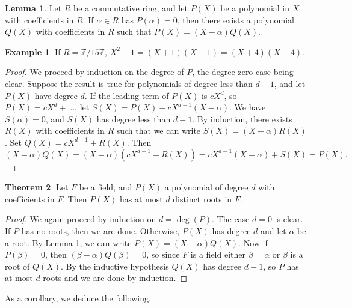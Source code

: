 \documentclass{article}
\newcommand{\Z}{\mathbb{Z}}
\newcommand{\rb}[1]{\left( #1 \right)}
\theoremstyle{definition}\newtheorem{definition}{Definition}
\theoremstyle{definition}\newtheorem*{remark}{Remark}
\theoremstyle{definition}\newtheorem*{example}{Example}
\theoremstyle{definition}\newtheorem*{note}{Note}
\newtheorem{lemma}[definition]{Lemma}
\newtheorem{theorem}[definition]{Theorem}
\begin{document}
\begin{lemma}
\label{lem:21}
Let $ R $ be a commutative ring, and let $ P\rb{X} $ be a polynomial in $ X $ with coefficients in $ R $. If $ \alpha \in R $ has $ P\rb{\alpha} = 0 $, then there exists a polynomial $ Q\rb{X} $ with coefficients in $ R $ such that $ P\rb{X} = \rb{X - \alpha}Q\rb{X} $.
\end{lemma}

\begin{example}
If $ R = \Z / 15\Z $, $ X^2 - 1 = \rb{X + 1}\rb{X - 1} = \rb{X + 4}\rb{X - 4} $.
\end{example}

\begin{proof}
We proceed by induction on the degree of $ P $, the degree zero case being clear. Suppose the result is true for polynomials of degree less than $ d - 1 $, and let $ P\rb{X} $ have degree $ d $. If the leading term of $ P\rb{X} $ is $ cX^d $, so $ P\rb{X} = cX^d + \dots $, let $ S\rb{X} = P\rb{X} - cX^{d - 1}\rb{X - \alpha} $. We have $ S\rb{\alpha} = 0 $, and $ S\rb{X} $ has degree less than $ d - 1 $. By induction, there exists $ R\rb{X} $ with coefficients in $ R $ such that we can write $ S\rb{X} = \rb{X - \alpha}R\rb{X} $. Set $ Q\rb{X} = cX^{d - 1} + R\rb{X} $. Then
$$ \rb{X - \alpha}Q\rb{X} = \rb{X - \alpha}\rb{cX^{d - 1} + R\rb{X}} = cX^{d - 1}\rb{X - \alpha} + S\rb{X} = P\rb{X}. $$
\end{proof}

\begin{theorem}
\label{thm:22}
Let $ F $ be a field, and $ P\rb{X} $ a polynomial of degree $ d $ with coefficients in $ F $. Then $ P\rb{X} $ has at most $ d $ distinct roots in $ F $.
\end{theorem}

\begin{proof}
We again proceed by induction on $ d = \deg\rb{P} $. The case $ d = 0 $ is clear. If $ P $ has no roots, then we are done. Otherwise, $ P\rb{X} $ has degree $ d $ and let $ \alpha $ be a root. By Lemma \ref{lem:21}, we can write $ P\rb{X} = \rb{X - \alpha}Q\rb{X} $. Now if $ P\rb{\beta} = 0 $, then $ \rb{\beta - \alpha}Q\rb{\beta} = 0 $, so since $ F $ is a field either $ \beta = \alpha $ or $ \beta $ is a root of $ Q\rb{X} $. By the inductive hypothesis $ Q\rb{X} $ has degree $ d - 1 $, so $ P $ has at most $ d $ roots and we are done by induction.
\end{proof}

As a corollary, we deduce the following.
\end{document}
